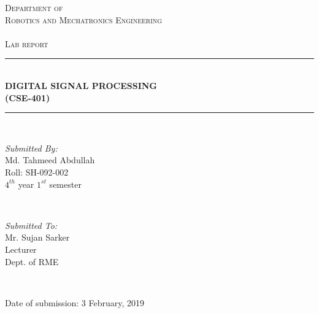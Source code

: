 \documentclass[a4paper,11pt]{article}
\begin{document}
	\begin{titlepage}
		
		\newcommand{\HRule}{\rule{\linewidth}{0.5mm}} %
		
		\center %
		
		
		
		\textsc{\LARGE Department of  }\\[0.3cm] %
		\textsc{\LARGE Robotics and Mechatronics Engineering  }\\[0.3cm]
		\textsc{\Large   }\\[0.3cm]
		\textsc{\Large Lab report }\\[0.5cm] %
		
		\HRule \\[0.4cm]
		{ \huge \bfseries DIGITAL SIGNAL PROCESSING}\\[0.4cm]  
		
		{ \huge \bfseries (CSE-401)}\\[0.03cm]
		\HRule \\[5cm]
		
		
		
		\begin{minipage}{0.4\textwidth}
			\begin{flushleft} \large
				\emph{Submitted By:}\\
				Md. Tahmeed Abdullah \\Roll: SH-092-002\\$4^{th}$ year $1^{st}$ semester %
			\end{flushleft}
		\end{minipage}
		~
		\begin{minipage}{0.4\textwidth}
			\begin{flushright} \large
				\emph{Submitted To:} \\
				Mr. Sujan Sarker\\Lecturer\\Dept. of RME %
			\end{flushright}
		\end{minipage}\\[1cm]
		
	
		
		\vfill
		
		{\LARGE Date of submission: 3 February, 2019 }\\[1cm] 
		
		
		
	\end{titlepage}
	\begin{center}
		
	\end{center}
	
\end{document}
